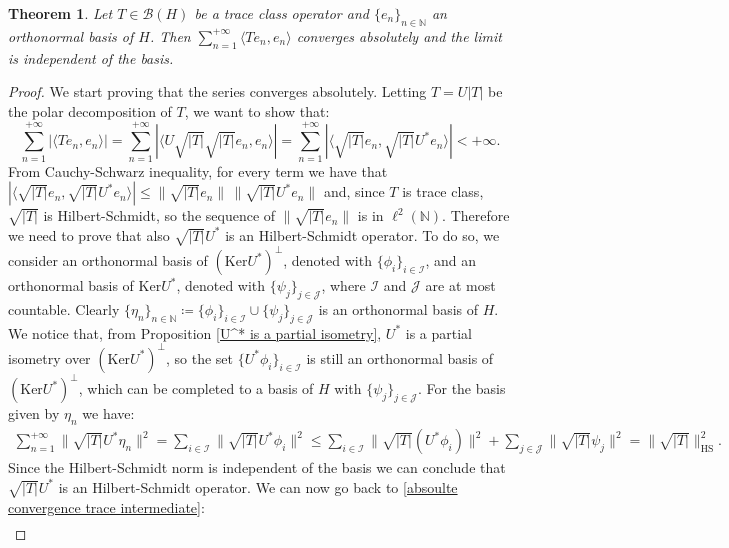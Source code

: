 \documentclass[corpo=11pt, stile=classica, tipotesi=custom,
greek, evenboxes, english]{toptesi}
\numberwithin{equation}{chapter}
\newtheorem{teo}{Theorem}[chapter] %
\theoremstyle{remark}
\newcommand{\N}{\mathbb{N}} %
\newcommand{\B}{\mathscr{B}} %
\begin{document}
\begin{teo}
	Let $T \in \B(H)$ be a trace class operator and $\{e_n\}_{n \in \N}$ an orthonormal basis of $H$. Then $\sum_{n=1}^{+\infty} \langle Te_n,e_n \rangle$ converges absolutely and the limit is independent of the basis.
\end{teo}
\begin{proof}
	{\color{red}We start proving that the series converges absolutely. Letting $T = U |T|$ be the polar decomposition of $T$, we want to show that:
		\begin{equation}\label{absoulte convergence trace intermediate}
			\sum_{n=1}^{+\infty} |\langle Te_n,e_n  \rangle| = \sum_{n=1}^{+\infty} |\langle U\sqrt{|T|}\sqrt{|T|}e_n,e_n \rangle| = \sum_{n=1}^{+\infty} |\langle \sqrt{|T|}e_n,\sqrt{|T|}U^*e_n\rangle| < +\infty.
		\end{equation}
		From Cauchy-Schwarz inequality, for every term we have that $|\langle \sqrt{|T|}e_n,\sqrt{|T|}U^*e_n\rangle| \leq \|\sqrt{|T|}e_n \|\,\| \sqrt{|T|}U^*e_n\|$ and, since $T$ is trace class, $\sqrt{|T|}$ is Hilbert-Schmidt, so the sequence of $\|\sqrt{|T|}e_n\|$ is in $\ell^2(\N)$. Therefore we need to prove that also $\sqrt{|T|}U^*$ is an Hilbert-Schmidt operator. To do so, we consider an orthonormal basis of $(\mathrm{Ker}U^*)^{\perp}$, denoted with $\{\phi_i\}_{i \in \mathcal{I}}$, and an orthonormal basis of $\mathrm{Ker}U^*$, denoted with $\{\psi_j\}_{j \in \mathcal{J}}$, where $\mathcal{I}$ and $\mathcal{J}$ are at most countable. Clearly $\{\eta_n\}_{n \in \N} \coloneqq \{\phi_i\}_{i \in \mathcal{I}} \cup\{\psi_j\}_{j \in \mathcal{J}}$ is an orthonormal basis of $H$. We notice that, from Proposition \ref{U^* is a partial isometry}, $U^*$ is a partial isometry over $(\mathrm{Ker}U^*)^{\perp}$, so the set $\{U^*\phi_i\}_{i \in \mathcal{I}}$ is still an orthonormal basis of $(\mathrm{Ker}U^*)^{\perp}$, which can be completed to a basis of $H$ with $\{\psi_j\}_ {j \in \mathcal{J}}$. For the basis given by $\eta_n$ we have:
		\begin{align*}
			\sum_{n=1}^{+\infty} \|\sqrt{|T|}U^* \eta_n\|^2 = \sum_{i \in \mathcal{I}} \| \sqrt{|T|} U^*\phi_i\|^2 \leq \sum_{i \in \mathcal{I}} \| \sqrt{|T|} (U^*\phi_i)\|^2 + \sum_{j \in \mathcal{J}} \|\sqrt{|T|} \psi_j\|^2 = \|\sqrt{|T|}\|_{\mathrm{HS}}^2.
		\end{align*}
		Since the Hilbert-Schmidt norm is independent of the basis we can conclude that $\sqrt{|T|}U^*$ is an Hilbert-Schmidt operator. We can now go back to \eqref{absoulte convergence trace intermediate}:
		\begin{align*}

\end{align*}}
\end{proof}
\end{document}

